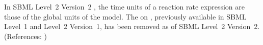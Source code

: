 In SBML Level~2 Version~2 , the time units of a reaction
rate expression are those of the global  units of the model.  The
  on \KineticLaw, previously available in SBML
Level~1 and Level~2 Version~1, has been removed as of SBML Level~2
Version~2.  (References: )
